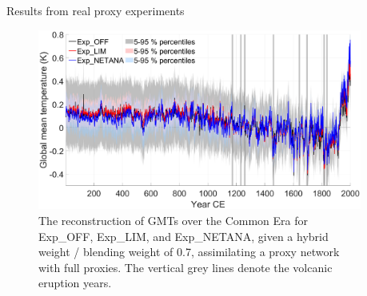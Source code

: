 \documentclass[final]{beamer}
\newlength{\sepwidth}
\newlength{\colwidth}
\newcommand{\separatorcolumn}{\begin{column}{\sepwidth}\end{column}}
\begin{document}
\begin{frame}[t]
\begin{columns}[t]
\begin{column}{\colwidth}
\begin{alertblock}{Results from real proxy experiments}
                    \begin{figure}
                        \begin{minipage}[t]{0.8\textwidth}
                            \centerline{\includegraphics[width=1\textwidth]{figure/Figure6.eps}}
                            \caption{The reconstruction of GMTs over the Common Era for Exp\_OFF, Exp\_LIM, and Exp\_NETANA, given a hybrid weight / blending weight of 0.7, assimilating a proxy network with full proxies. The vertical grey lines denote the volcanic eruption years.}\label{fig6}
                        \end{minipage}
                    \end{figure}
    			\end{alertblock}
    			
    		\end{column}		
    		\separatorcolumn
    	\end{columns}
    \end{frame}
\end{document}
